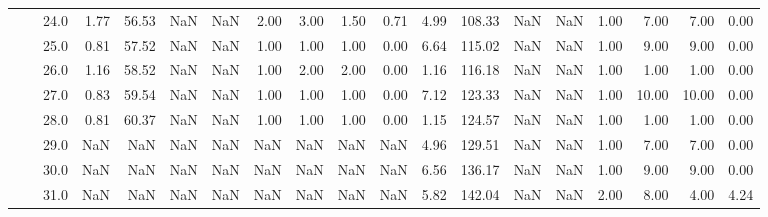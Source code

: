 \begin{tabular}{lllrrrrrrrrrrrrrrrr}
       &     & 24.0 &      1.77 &      56.53 &               NaN &                NaN &  2.00 &   3.00 &             1.50 &                         0.71 &      4.99 &     108.33 &               NaN &                NaN & 1.00 &   7.00 &             7.00 &                         0.00 \\
       &     & 25.0 &      0.81 &      57.52 &               NaN &                NaN &  1.00 &   1.00 &             1.00 &                         0.00 &      6.64 &     115.02 &               NaN &                NaN & 1.00 &   9.00 &             9.00 &                         0.00 \\
       &     & 26.0 &      1.16 &      58.52 &               NaN &                NaN &  1.00 &   2.00 &             2.00 &                         0.00 &      1.16 &     116.18 &               NaN &                NaN & 1.00 &   1.00 &             1.00 &                         0.00 \\
       &     & 27.0 &      0.83 &      59.54 &               NaN &                NaN &  1.00 &   1.00 &             1.00 &                         0.00 &      7.12 &     123.33 &               NaN &                NaN & 1.00 &  10.00 &            10.00 &                         0.00 \\
       &     & 28.0 &      0.81 &      60.37 &               NaN &                NaN &  1.00 &   1.00 &             1.00 &                         0.00 &      1.15 &     124.57 &               NaN &                NaN & 1.00 &   1.00 &             1.00 &                         0.00 \\
       &     & 29.0 &       NaN &        NaN &               NaN &                NaN &   NaN &    NaN &              NaN &                          NaN &      4.96 &     129.51 &               NaN &                NaN & 1.00 &   7.00 &             7.00 &                         0.00 \\
       &     & 30.0 &       NaN &        NaN &               NaN &                NaN &   NaN &    NaN &              NaN &                          NaN &      6.56 &     136.17 &               NaN &                NaN & 1.00 &   9.00 &             9.00 &                         0.00 \\
       &     & 31.0 &       NaN &        NaN &               NaN &                NaN &   NaN &    NaN &              NaN &                          NaN &      5.82 &     142.04 &               NaN &                NaN & 2.00 &   8.00 &             4.00 &                         4.24 \\

\end{tabular}
